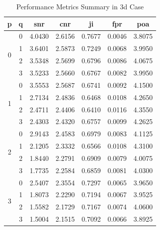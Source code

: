 \begin{table}[htbp!]
\centering
\caption{Performance Metrics Summary in \gls{3d} Case}
\begin{tabular}{ccccccc}
\hline
\textbf{p} & \textbf{q} & \textbf{\gls{snr}} & \textbf{\gls{cnr}} & \gls{ji} & \gls{fpr} & \gls{poa} \\ \hline
\multirow{4}{*}{0} & 0 & 4.0430 & 2.6156 & 0.7677 & 0.0046 & 3.8075 \\
 & 1 & 3.6401 & 2.5873 & 0.7249 & 0.0068 & 3.9950 \\
 & 2 & 3.5348 & 2.5699 & 0.6796 & 0.0086 & 4.0675 \\
 & 3 & 3.5233 & 2.5660 & 0.6767 & 0.0082 & 3.9950 \\ \hline
\multirow{4}{*}{1} & 0 & 3.5553 & 2.5687 & 0.6741 & 0.0092 & 4.1500 \\
 & 1 & 2.7134 & 2.4836 & 0.6468 & 0.0108 & 4.2650 \\
 & 2 & 2.4711 & 2.4406 & 0.6410 & 0.0116 & 4.3550 \\
 & 3 & 2.4303 & 2.4320 & 0.6757 & 0.0099 & 4.2625 \\ \hline
\multirow{4}{*}{2} & 0 & 2.9143 & 2.4583 & 0.6979 & 0.0083 & 4.1125 \\
 & 1 & 2.1205 & 2.3332 & 0.6566 & 0.0108 & 4.3100 \\
 & 2 & 1.8440 & 2.2791 & 0.6909 & 0.0079 & 4.0075 \\
 & 3 & 1.7735 & 2.2584 & 0.6859 & 0.0081 & 4.0300 \\ \hline
\multirow{4}{*}{3} & 0 & 2.5407 & 2.3554 & 0.7297 & 0.0065 & 3.9650 \\
 & 1 & 1.8073 & 2.2290 & 0.7194 & 0.0067 & 3.9525 \\
 & 2 & 1.5582 & 2.1729 & 0.7167 & 0.0074 & 4.0600 \\
 & 3 & 1.5004 & 2.1515 & 0.7092 & 0.0066 & 3.8925 \\ \hline
\end{tabular}
\label{tab:perfSum3D}
\end{table}


